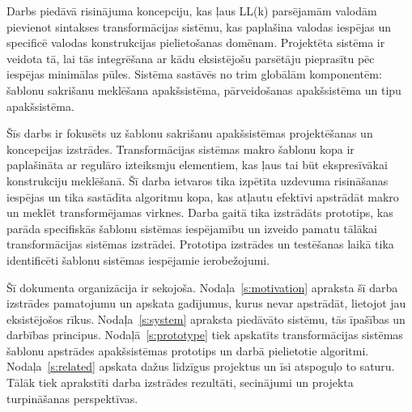 Darbs piedāvā risinājuma koncepciju, kas ļaus LL(k) parsējamām valodām pievienot sintakses transformācijas sistēmu, kas paplašina valodas iespējas un specificē valodas konstrukcijas pielietošanas domēnam. Projektēta sistēma ir veidota tā, lai tās integrēšana ar kādu eksistējošu parsētāju pieprasītu pēc iespējas minimālas pūles. Sistēma sastāvēs no trim globālām komponentēm: šablonu sakrišanu meklēšana apakšsistēma, pārveidošanas apakšsistēma un tipu apakšsistēma. %

Šīs darbs ir fokusēts uz šablonu sakrišanu apakšsistēmas projektēšanas un koncepcijas izstrādes. Transformācijas sistēmas makro šablonu kopa ir paplašināta ar regulāro izteiksmju elementiem, kas ļaus tai būt ekspresīvākai konstrukciju meklēšanā. Šī darba ietvaros tika izpētīta uzdevuma risināšanas iespējas un tika sastādīta algoritmu kopa, kas atļautu efektīvi apstrādāt makro un meklēt transformējamas virknes. Darba gaitā tika izstrādāts prototips, kas parāda specifiskās šablonu sistēmas iespējamību un izveido pamatu tālākai transformācijas sistēmas izstrādei. Prototipa izstrādes un testēšanas laikā tika identificēti šablonu sistēmas iespējamie ierobežojumi.



Šī dokumenta organizācija ir sekojoša. Nodaļa~\ref{s:motivation} apraksta šī darba izstrādes pamatojumu un apskata gadījumus, kurus nevar apstrādāt, lietojot jau eksistējošos rīkus. Nodaļa~\ref{s:system} apraksta piedāvāto sistēmu, tās īpašības un darbības principus. Nodaļā~\ref{s:prototype} tiek apskatīts transformācijas sistēmas šablonu apstrādes apakšsistēmas prototips un darbā pielietotie algoritmi. Nodaļa~\ref{s:related} apskata dažus līdzīgus projektus un īsi atspoguļo to saturu. Tālāk tiek aprakstīti darba izstrādes rezultāti, secinājumi un projekta turpināšanas perspektīvas.